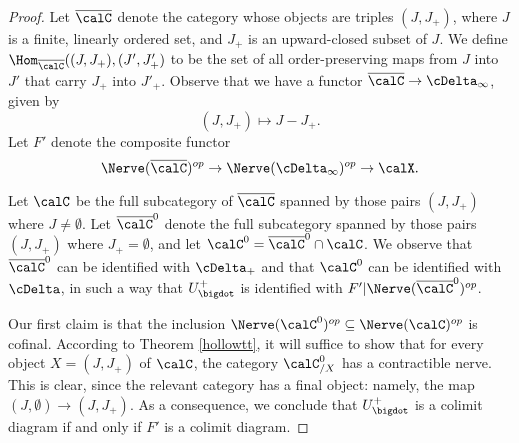 \begin{proof}
Let $\overline{\calC}$ denote the category whose objects are triples $(J, J_{+})$, where $J$ is a finite, linearly ordered set, and $J_{+}$ is an upward-closed subset of $J$. We define
$\Hom_{\overline{\calC}}( (J, J_{+}), (J', J'_{+})$ to be the set of all order-preserving maps
from $J$ into $J'$ that carry $J_{+}$ into $J'_{+}$. Observe that we have a functor
$\overline{\calC} \rightarrow \cDelta_{\infty}$, given by
$$ (J, J_{+}) \mapsto J - J_{+}. $$
Let $F'$ denote the composite functor
$$ \Nerve(\overline{\calC})^{op} \rightarrow \Nerve(\cDelta_{\infty})^{op} \rightarrow \calX.$$

Let $\calC$ be the full subcategory of $\overline{\calC}$ spanned by those pairs $(J, J_+)$ where
$J \neq \emptyset$. Let $\overline{\calC}^{0}$ denote the full subcategory spanned by those pairs $(J, J_{+})$ where $J_{+} = \emptyset$, and let $\calC^{0} = \overline{\calC}^0 \cap \calC$.
We observe that $\overline{\calC}^{0}$ can be identified with $\cDelta_{+}$ and
that $\calC^{0}$ can be identified with $\cDelta$, in such a way that $U^{+}_{\bigdot}$ is identified with $F' | \Nerve (\overline{\calC}^{0})^{op}$.

Our first claim is that the inclusion $\Nerve(\calC^{0})^{op} \subseteq \Nerve(\calC)^{op}$ is cofinal. According to Theorem \ref{hollowtt}, it will suffice
to show that for every object $X = (J, J_{+})$ of $\calC$, the category
$\calC^{0}_{/X}$ has a contractible nerve. This is clear, since the relevant category has a final object: namely, the map $(J, \emptyset) \rightarrow (J, J_{+})$. As a consequence, we conclude that 
$U_{\bigdot}^{+}$ is a colimit diagram if and only if $F'$ is a colimit diagram.


\end{proof}
